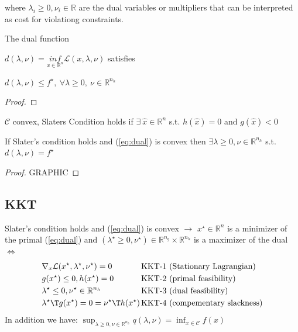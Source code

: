 where $\lambda_i \ge 0, \nu_i \in \mathbb{R}$ are the dual variables or multipliers
that can be interpreted as cost for violationg constraints.

\begin{proposition}
	The  dual function

	$d(\lambda,\nu) = \underset{x \in \mathcal{\mathbb{R}}^n}{inf}\mathcal{L}(x,\lambda,\nu)$ satisfies

	$d(\lambda,\nu)\le f^\star,\ \forall \lambda\ge 0,\ \nu \in \mathbb{R}^{n_h}$

\end{proposition}

\begin{proof}
\end{proof}

\begin{definition}
	$\mathcal{C}$ convex, Slaters Condition holds if
	$\exists\ \hat{x} \in \mathbb{R}^{n}$ s.t. $h(\hat{x})=0$ and $g(\hat{x})<0$
\end{definition}

\begin{proposition}
	If Slater's condition holds and (\ref{eq:dual}) is convex then
	$\exists \lambda \ge 0, \nu \in \mathbb{R}^{n_h}$ s.t. $d(\lambda,\nu)=f^\star$
\end{proposition}

\begin{proof}
	GRAPHIC
\end{proof}

\subsection{KKT}

\begin{theorem}
	Slater's condition holds
	and (\ref{eq:dual}) is convex
	$\rightarrow$
	$x^\star \in \mathbb{R}^{n}$ is a minimizer of the primal (\ref{eq:dual})
	and $(\lambda^\star \ge 0,\nu^\star) \in \mathbb{R}^{n_g}\times\mathbb{R}^{n_h}$ is a maximizer of the dual
	$\Leftrightarrow$
	$$\begin{aligned}
			              & \nabla_x\mathcal{L}(x^\star,\lambda^\star,\nu^\star)=0
			              & \text{KKT-1 }
			              & \text{(Stationary Lagrangian)}
			\\
			              & g(x^\star)\le0, h(x^\star)=0
			              & \text{KKT-2 }
			              & \text{(primal feasibility)}
			\\
			              & \lambda^\star\le0, \nu^\star \in \mathbb{R}^{n_h}
			              & \text{KKT-3 }
			              & \text{(dual feasibility)}
			\\
			              & {\lambda^\star}\T g(x^\star)=0={\nu^\star}\T h(x^\star)
			\hspace{-3mm} &
			\text{KKT-4 }
			              & \text{(compementary slackness)}
			\\
		\end{aligned}$$
	In addition we have:
	$\sup_{\lambda\ge0,\nu\in\mathbb{R}^{n_h}}q(\lambda,\nu)=\inf_{x\in\mathcal{C}}f(x)$
\end{theorem}

